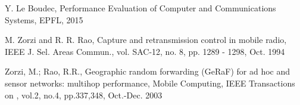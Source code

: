 \documentclass[10pt]{article}
\begin{document}
\FloatBarrier

\begin{thebibliography}{10}

Y. Le Boudec, Performance Evaluation of Computer and Communications Systems, EPFL, 2015

M. Zorzi and R. R. Rao, Capture and retransmission control in
mobile radio, IEEE J. Sel. Areas Commun., vol. SAC-12, no. 8, pp.
1289 - 1298, Oct. 1994

Zorzi, M.; Rao, R.R., Geographic random forwarding (GeRaF) for ad hoc and sensor networks: multihop performance, Mobile Computing, IEEE Transactions on , vol.2, no.4, pp.337,348, Oct.-Dec. 2003


\end{thebibliography}
\end{document}
